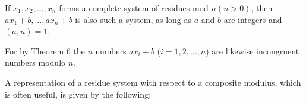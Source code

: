 If $x_1, x_2, \ldots, x_n$ forms a complete system of residues mod $n(n > 0)$, then $ax_1 + b, \ldots, ax_n + b$ is also such a system, as long as $a$ and $b$ are integers and $(a, n) = 1$.

For by Theorem 6 the $n$ numbers $ax_i + b$ ($i = 1, 2, \ldots, n$) are likewise incongruent numbers modulo $n$.

A representation of a residue system with respect to a composite modulus, which is often useful, is given by the following:
